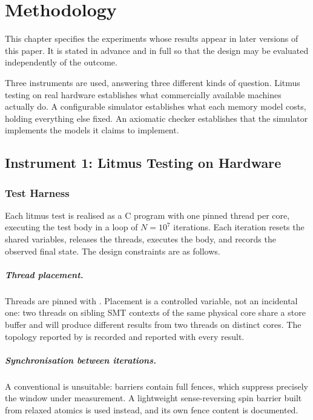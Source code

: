 \chapter{Methodology}
\label{ch:methodology}

This chapter specifies the experiments whose results appear in later versions of
this paper.
It is stated in advance and in full so that the design may be
evaluated independently of the outcome.

Three instruments are used, answering three different kinds of question.
Litmus testing on real hardware establishes what commercially available machines
actually do.
A configurable simulator establishes what each memory model costs,
holding everything else fixed. An axiomatic checker establishes that the simulator
implements the models it claims to implement.

\section{Instrument 1: Litmus Testing on Hardware}
\label{sec:litmus-method}

\subsection{Test Harness}

Each litmus test is realised as a C program with one pinned thread per core,
executing the test body in a loop of $N = 10^7$ iterations.
Each iteration
resets the shared variables, releases the threads, executes the body, and records
the observed final state.
The design constraints are as follows.

\paragraph{Thread placement.} Threads are pinned with
. Placement is a controlled variable, not an
incidental one: two threads on sibling SMT contexts of the same physical core
share a store buffer and will produce different results from two threads on
distinct cores.
The topology reported by  is recorded and reported
with every result.

\paragraph{Synchronisation between iterations.} A conventional
 is unsuitable: barriers contain full fences, which suppress
precisely the window under measurement.
A lightweight sense-reversing spin barrier
built from relaxed atomics is used instead, and its own fence content is documented.

